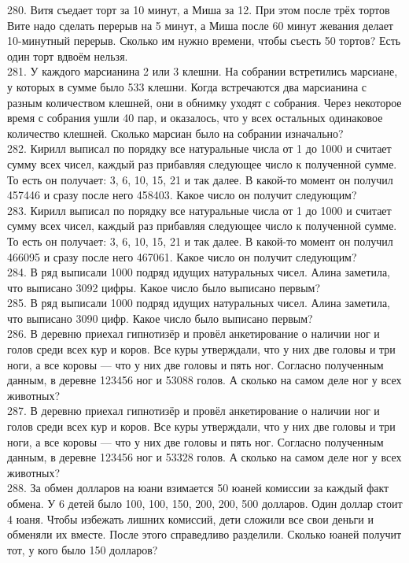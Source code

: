 280. Витя съедает торт за 10 минут, а Миша за 12. При этом после трёх тортов Вите надо сделать перерыв на 5 минут, а Миша после 60 минут жевания делает 10-минутный перерыв. Сколько им нужно времени, чтобы съесть 50 тортов? Есть один торт вдвоём нельзя.\\
281. У каждого марсианина 2 или 3 клешни. На собрании встретились марсиане, у которых в сумме было 533 клешни. Когда встречаются два марсианина с разным количеством клешней, они в обнимку уходят с собрания. Через некоторое время с собрания ушли 40 пар, и оказалось, что у всех остальных одинаковое количество клешней. Сколько марсиан было на собрании изначально?\\
282. Кирилл выписал по порядку все натуральные числа от 1 до 1000 и считает сумму всех чисел, каждый раз прибавляя следующее число к полученной сумме. То есть он получает: 3, 6, 10, 15, 21 и так далее. В какой-то момент он получил 457446 и сразу после него 458403. Какое число он получит следующим?\\
283. Кирилл выписал по порядку все натуральные числа от 1 до 1000 и считает сумму всех чисел, каждый раз прибавляя следующее число к полученной сумме. То есть он получает: 3, 6, 10, 15, 21 и так далее. В какой-то момент он получил 466095 и сразу после него 467061. Какое число он получит следующим?\\
284. В ряд выписали 1000 подряд идущих натуральных чисел. Алина заметила, что выписано 3092 цифры. Какое число было выписано первым?\\
285. В ряд выписали 1000 подряд идущих натуральных чисел. Алина заметила, что выписано 3090 цифр. Какое число было выписано первым?\\
286. В деревню приехал гипнотизёр и провёл анкетирование о наличии ног и голов среди всех кур и коров. Все куры утверждали, что у них две головы и три ноги, а все коровы --- что у них две головы и пять ног. Согласно полученным данным, в деревне 123456 ног и 53088 голов. А сколько на самом деле ног у всех животных?\\
287. В деревню приехал гипнотизёр и провёл анкетирование о наличии ног и голов среди всех кур и коров. Все куры утверждали, что у них две головы и три ноги, а все коровы --- что у них две головы и пять ног. Согласно полученным данным, в деревне 123456 ног и 53328 голов. А сколько на самом деле ног у всех животных?\\
288. За обмен долларов на юани взимается 50 юаней комиссии за каждый факт обмена. У 6 детей было 100, 100, 150, 200, 200, 500 долларов. Один доллар стоит 4 юаня. Чтобы избежать лишних комиссий, дети сложили все свои деньги и обменяли их вместе. После этого справедливо разделили. Сколько юаней получит тот, у кого было 150 долларов?\\
